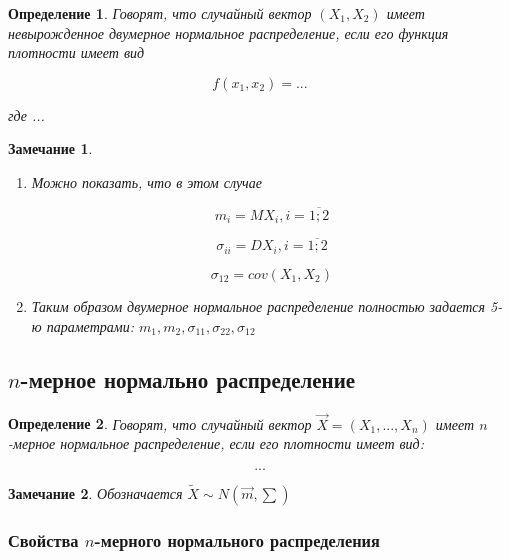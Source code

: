 \documentclass[a4paper, 14pt]{report}
\newtheorem{defenition}{Определение}[section]
\newtheorem{note}{Замечание}[section]
\begin{document}
\begin{defenition}
    Говорят, что случайный вектор $(X_1, X_2)$ имеет невырожденное двумерное нормальное распределение, если его функция плотности имеет вид

    $$
    f(x_1, x_2) = ...
    $$

    где ...
\end{defenition}

\begin{note}
    \begin{enumerate}
        \item Можно показать, что в этом случае

            $$
            m_i = MX_i, i = \overline{1;2}
            $$

            $$
            \sigma_{ii} = DX_i, i = \overline{1;2}
            $$

            $$
            \sigma_{12} = cov(X_1, X_2)
            $$

        \item Таким образом двумерное нормальное распределение полностью задается 5-ю параметрами: $m_1, m_2, \sigma_{11}, \sigma_{22}, \sigma_{12}$
    \end{enumerate}
\end{note}

\subsection{$n$-мерное нормально распределение}

\begin{defenition}
    Говорят, что случайный вектор $\vec X = (X_1, ..., X_n)$ имеет $n$-мерное нормальное распределение, если его плотности имеет вид:

    $$
    ...
    $$
\end{defenition}

\begin{note}
    Обозначается $\tilde X \sim N(\vec m, \sum)$
\end{note}

\subsubsection{Свойства $n$-мерного нормального распределения}
\end{document}
